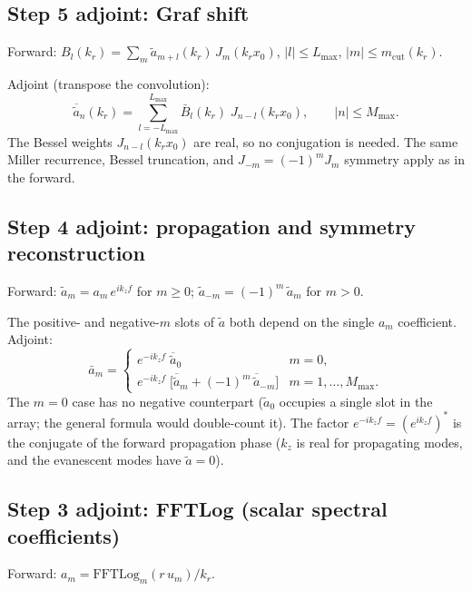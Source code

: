 \documentclass[11pt,a4paper]{article}
\begin{document}
\subsection{Step 5 adjoint: Graf shift}

Forward: $B_l(k_r) = \sum_{m} \tilde a_{m+l}(k_r)\,J_m(k_r x_0)$,\;
$|l| \le L_{\max}$,\; $|m| \le m_{\mathrm{cut}}(k_r)$.

Adjoint (transpose the convolution):
\begin{equation}\label{eq:adj_graf}
  \overline{\tilde a}_n(k_r) = \sum_{l=-L_{\max}}^{L_{\max}}
  \bar B_l(k_r)\;J_{n-l}(k_r x_0),
  \qquad |n| \le M_{\max}.
\end{equation}
The Bessel weights $J_{n-l}(k_r x_0)$ are real, so no conjugation is needed.
The same Miller recurrence, Bessel truncation, and $J_{-m} = (-1)^m J_m$
symmetry apply as in the forward.


\subsection{Step 4 adjoint: propagation and symmetry reconstruction}

Forward: $\tilde a_m = a_m\,e^{ik_z f}$ for $m \ge 0$;\;
$\tilde a_{-m} = (-1)^m\,\tilde a_m$ for $m > 0$.

The positive- and negative-$m$ slots of $\tilde a$ both depend on the single
$a_m$ coefficient.  Adjoint:
\begin{equation}\label{eq:adj_prop}
  \bar a_m = \begin{cases}
    e^{-ik_z f}\;\overline{\tilde a}_0 & m = 0,\\[4pt]
    e^{-ik_z f}\;\bigl[\overline{\tilde a}_m + (-1)^m\,\overline{\tilde a}_{-m}\bigr]
    & m = 1,\ldots,M_{\max}.
  \end{cases}
\end{equation}
The $m = 0$ case has no negative counterpart ($\tilde a_0$ occupies a single
slot in the array; the general formula would double-count it).
The factor $e^{-ik_z f} = (e^{ik_z f})^*$ is the conjugate of the
forward propagation phase ($k_z$ is real for propagating modes, and the
evanescent modes have $\tilde a = 0$).


\subsection{Step 3 adjoint: FFTLog (scalar spectral coefficients)}

Forward: $a_m = \mathrm{FFTLog}_m(r\,u_m)\big/k_r$.
\end{document}
